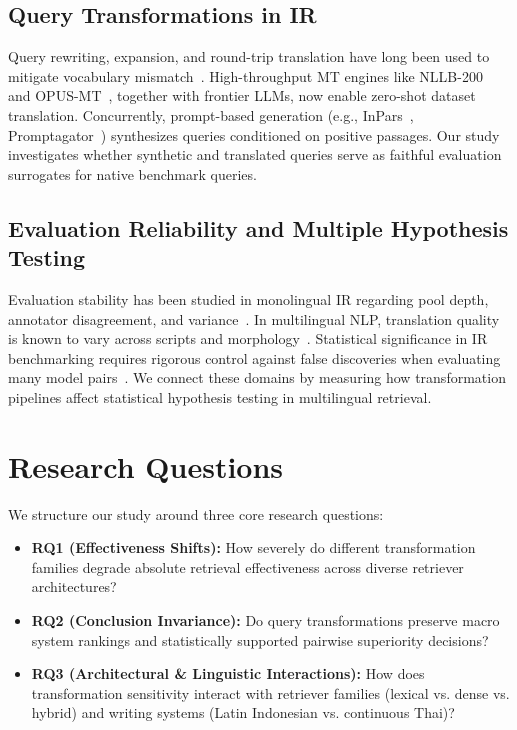 \documentclass[runningheads]{llncs}
\begin{document}
\subsection{Query Transformations in IR}
Query rewriting, expansion, and round-trip translation have long been used to mitigate vocabulary mismatch~\cite{gao2022neural,robertson2009probabilistic}. High-throughput MT engines like NLLB-200~\cite{nllb2022} and OPUS-MT~\cite{tiedemann2020opus}, together with frontier LLMs, now enable zero-shot dataset translation. Concurrently, prompt-based generation (e.g., InPars~\cite{bonifacio2022inpars}, Promptagator~\cite{dai2023promptagator}) synthesizes queries conditioned on positive passages. Our study investigates whether synthetic and translated queries serve as faithful evaluation surrogates for native benchmark queries.

\subsection{Evaluation Reliability and Multiple Hypothesis Testing}
Evaluation stability has been studied in monolingual IR regarding pool depth, annotator disagreement, and variance~\cite{sanderson2010test,voorhees2002philosophy,urbano2019statistical,webber2010similarity}. In multilingual NLP, translation quality is known to vary across scripts and morphology~\cite{nllb2022}. Statistical significance in IR benchmarking requires rigorous control against false discoveries when evaluating many model pairs~\cite{carterette2012multiple,benjamini1995controlling}. We connect these domains by measuring how transformation pipelines affect statistical hypothesis testing in multilingual retrieval.

\section{Research Questions}
\label{sec:rqs}
We structure our study around three core research questions:
\begin{itemize}
    \item \textbf{RQ1 (Effectiveness Shifts):} How severely do different transformation families degrade absolute retrieval effectiveness across diverse retriever architectures?
    \item \textbf{RQ2 (Conclusion Invariance):} Do query transformations preserve macro system rankings and statistically supported pairwise superiority decisions?
    \item \textbf{RQ3 (Architectural \& Linguistic Interactions):} How does transformation sensitivity interact with retriever families (lexical vs. dense vs. hybrid) and writing systems (Latin Indonesian vs. continuous Thai)?
\end{itemize}
\end{document}
